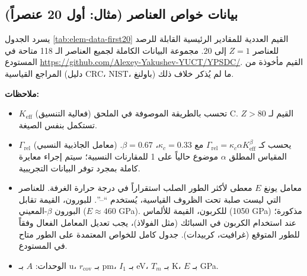 \documentclass[11pt,a4paper]{article}
\newcommand{\Keff}{K_{\mathrm{eff}}}
\begin{document}
	\begin{otherlanguage}{arabic}
		
		\subsection{بيانات خواص العناصر (مثال: أول 20 عنصراً)}
		
		يسرد الجدول \ref{tab:elem-data-first20} القيم العددية للمقادير الرئيسية القابلة للرصد للعناصر \(Z=1\) إلى \(20\). مجموعة البيانات الكاملة لجميع العناصر الـ 118 متاحة في المستودع \url{https://github.com/Alexey-Yakushev-YUCT/YPSDC/}. القيم مأخوذة من المراجع القياسية (دليل CRC، NIST، باولنغ) ما لم يُذكر خلاف ذلك.
		
		\textbf{ملاحظات:}
		\begin{itemize}
			\item \(\Keff\) (فعالية التنسيق) تحسب بالطريقة الموصوفة في الملحق C. القيم لـ \(Z>80\) تستكمل بنفس الصيغة.
			\item \(\Gamma_{\text{rel}}\) (معامل الجاذبية النسبي) يحسب كـ \(\Gamma_{\text{rel}} = \kappa_c \alpha \Keff^{\beta}\) مع \(\kappa_c=0.33\)، \(\beta=0.67\). المقياس المطلق \(\alpha\) موضوع حالياً على 1 للمقارنات النسبية؛ سيتم إجراء معايرة كاملة بمجرد توفر البيانات التجريبية.
			\item معامل يونغ \(E\) معطى لأكثر الطور الصلب استقراراً في درجة حرارة الغرفة. للعناصر التي ليست صلبة تحت الظروف القياسية، يُستخدم “–”. للبورون، القيمة تقابل البورون \(\beta\)-المعيني (\(E \approx 460\) GPa). للكربون، القيمة للألماس (1050 GPa) مذكورة؛ عند استخدام الكربون في السبائك (مثل الفولاذ)، يجب تعديل المعامل الفعال وفقاً للطور المتوقع (غرافيت، كربيدات). جدول كامل للخواص المعتمدة على الطور متاح في المستودع.
			\item الوحدات: \(A\) بـ u، \(r_{\text{cov}}\) بـ pm، \(I_1\) بـ eV، \(T_m\) بـ K، \(E\) بـ GPa.
		\end{itemize}
		

\end{otherlanguage}
\end{document}
